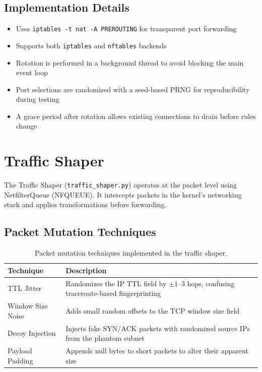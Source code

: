 \subsection{Implementation Details}

\begin{itemize}
    \item Uses \texttt{iptables -t nat -A PREROUTING} for transparent port forwarding
    \item Supports both \texttt{iptables} and \texttt{nftables} backends
    \item Rotation is performed in a background thread to avoid blocking the main event loop
    \item Port selections are randomized with a seed-based PRNG for reproducibility during testing
    \item A grace period after rotation allows existing connections to drain before rules change
\end{itemize}

\section{Traffic Shaper}

The Traffic Shaper (\texttt{traffic\_shaper.py}) operates at the packet level using NetfilterQueue (NFQUEUE). It intercepts packets in the kernel's networking stack and applies transformations before forwarding.

\subsection{Packet Mutation Techniques}

\begin{table}[H]
\centering
\caption{Packet mutation techniques implemented in the traffic shaper.}
\label{tab:mutations}
\begin{tabular}{lp{9cm}}
\toprule
\textbf{Technique} & \textbf{Description} \\
\midrule
TTL Jitter & Randomizes the IP TTL field by $\pm 1$--$3$ hops, confusing traceroute-based fingerprinting \\
Window Size Noise & Adds small random offsets to the TCP window size field \\
Decoy Injection & Injects fake SYN/ACK packets with randomized source IPs from the phantom subnet \\
Payload Padding & Appends null bytes to short packets to alter their apparent size \\
\bottomrule
\end{tabular}
\end{table}

